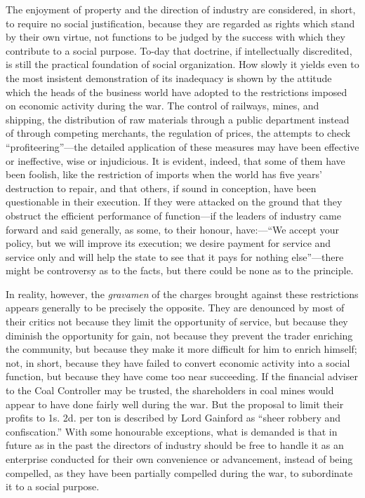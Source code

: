 \documentclass{book}
\begin{document}
The enjoyment of property and the direction of industry are considered, in short, to require no social justification, because they are regarded as rights which stand by their own virtue, not functions to be judged by the success with which they contribute to a social purpose. To-day that doctrine, if intellectually discredited, is still the practical foundation of social organization. How slowly it yields even to the most insistent demonstration of its inadequacy is shown by the attitude which the heads of the business world have adopted to the restrictions imposed on economic activity during the war. The control of railways, mines, and shipping, the distribution of raw materials through a public department instead of through competing merchants, the regulation of prices, the attempts to check “profiteering”—the detailed application of these measures may have been effective or ineffective, wise or injudicious. It is evident, indeed, that some of them have been foolish, like the restriction of imports when the world has five years’ destruction to repair, and that others, if sound in conception, have been questionable in their execution. If they were attacked on the ground that they obstruct the efficient performance of function—if the leaders of industry came forward and said generally, as some, to their honour, have:—“We accept your policy, but we will improve its execution; we desire payment for service and service only and will help the state to see that it pays for nothing else”—there might be controversy as to the facts, but there could be none as to the principle.

In reality, however, the \emph{gravamen} of the charges brought against these restrictions appears generally to be precisely the opposite. They are denounced by most of their critics not because they limit the opportunity of service, but because they diminish the opportunity for gain, not because they prevent the trader enriching the community, but because they make it more difficult for him to enrich himself; not, in short, because they have failed to convert economic activity into a social function, but because they have come too near succeeding. If the financial adviser to the Coal Controller may be trusted, the shareholders in coal mines would appear to have done fairly well during the war. But the proposal to limit their profits to 1s. 2d. per ton is described by Lord Gainford as “sheer robbery and confiscation.” With some honourable exceptions, what is demanded is that in future as in the past the directors of industry should be free to handle it as an enterprise conducted for their own convenience or advancement, instead of being compelled, as they have been partially compelled during the war, to subordinate it to a social purpose.
\end{document}

